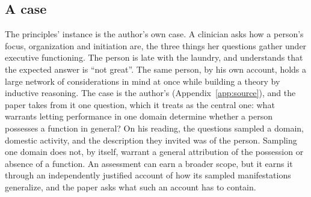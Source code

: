 
\subsection{A case}

The principles' instance is the author's own case. A clinician asks how a person's focus, organization and initiation are, the three things her questions gather under executive functioning. The person is late with the laundry, and understands that the expected answer is ``not great''. The same person, by his own account, holds a large network of considerations in mind at once while building a theory by inductive reasoning. The case is the author's (Appendix~\ref{app:source}), and the paper takes from it one question, which it treats as the central one: what warrants letting performance in one domain determine whether a person possesses a function in general? On his reading, the questions sampled a domain, domestic activity, and the description they invited was of the person. Sampling one domain does not, by itself, warrant a general attribution of the possession or absence of a function. An assessment can earn a broader scope, but it earns it through an independently justified account of how its sampled manifestations generalize, and the paper asks what such an account has to contain.

